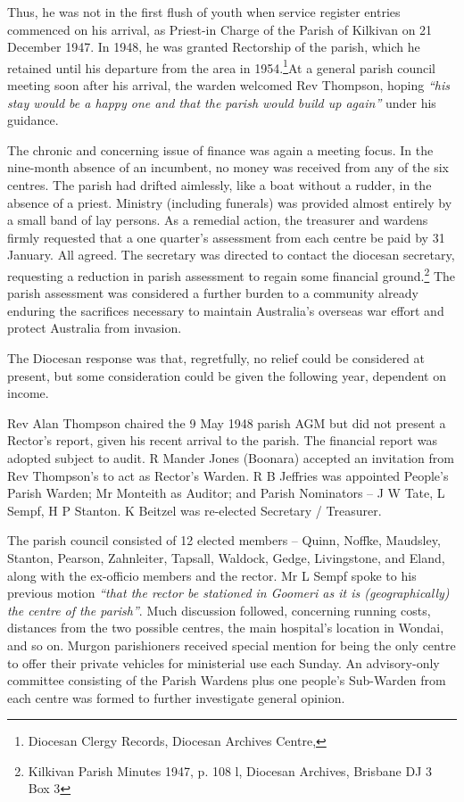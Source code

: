 Thus, he was not in the first flush of youth when service register entries commenced on his arrival, as Priest-in Charge of the Parish of Kilkivan on 21 December 1947. In 1948, he was granted Rectorship of the parish, which he retained until his departure from the area in 1954.\footnote{Diocesan Clergy Records, Diocesan Archives Centre,}At a general parish council meeting soon after his arrival, the warden welcomed Rev Thompson, hoping \emph{``his stay would be a happy one and that the parish would build up again''} under his guidance.


The chronic and concerning issue of finance was again a meeting focus. In the nine-month absence of an incumbent, no money was received from any of the six centres. The parish had drifted aimlessly, like a boat without a rudder, in the absence of a priest. Ministry (including funerals) was provided almost entirely by a small band of lay persons. As a remedial action, the treasurer and wardens firmly requested that a one quarter's assessment from each centre be paid by 31 January. All agreed. The secretary was directed to contact the diocesan secretary, requesting a reduction in parish assessment to regain some financial ground.\footnote{Kilkivan Parish Minutes 1947, p. 108 l, Diocesan Archives, Brisbane DJ 3 Box 3} The parish assessment was considered a further burden to a community already enduring the sacrifices necessary to maintain Australia's overseas war effort and protect Australia from invasion.


The Diocesan response was that, regretfully, no relief could be considered at present, but some consideration could be given the following year, dependent on income.



Rev Alan Thompson chaired the 9 May 1948 parish AGM but did not present a Rector's report, given his recent arrival to the parish. The financial report was adopted subject to audit. R Mander Jones (Boonara) accepted an invitation from Rev Thompson's to act as Rector's Warden. R B Jeffries was appointed People's Parish Warden; Mr Monteith as Auditor; and Parish Nominators -- J W Tate, L Sempf, H P Stanton. K Beitzel was re-elected Secretary / Treasurer.



The parish council consisted of 12 elected members -- Quinn, Noffke, Maudsley, Stanton, Pearson, Zahnleiter, Tapsall, Waldock, Gedge, Livingstone, and Eland, along with the ex-officio members and the rector. Mr L Sempf spoke to his previous motion \emph{``that the rector be stationed in Goomeri as it is (geographically) the centre of the parish''}. Much discussion followed, concerning running costs, distances from the two possible centres, the main hospital's location in Wondai, and so on. Murgon parishioners received special mention for being the only centre to offer their private vehicles for ministerial use each Sunday. An advisory-only committee consisting of the Parish Wardens plus one people's Sub-Warden from each centre was formed to further investigate general opinion.



